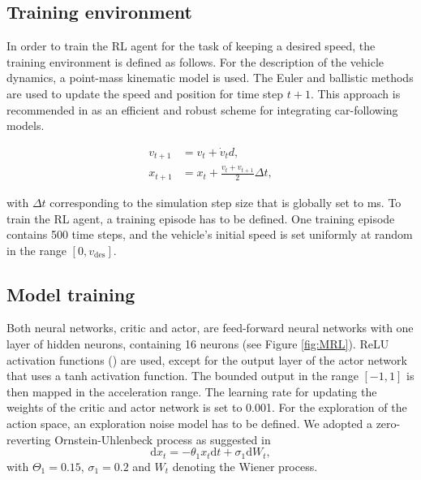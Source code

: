 \documentclass[review]{elsarticle}
\providecommand{\sub}[1]{_{\mathrm{#1}}}  %
\providecommand{\3}{{\ss}}
\begin{document}
	
	\subsection{Training environment}
	\label{training_environment1}
	In order to train the RL agent for the task of keeping a desired
	speed, the training environment is defined as follows. For the description of the vehicle dynamics, a point-mass kinematic model is used. The Euler and ballistic methods are used to update the speed and position for time step $t + 1$. This approach is recommended in \cite{numericalUpdateMethodsTreiber} as an efficient
	and robust scheme for integrating car-following models.
	
	\begin{align}
	v_{t+1} &= v_{t} + \dot{v}_{t} d, \\
	x_{t+1} &= x_{t} + \frac{v_{t} + v_{t+1}}{2} \Delta t,
	\end{align}
	
	
	with $\Delta t$ corresponding to the simulation step size that is globally
	set to \unit[100]{ms}. To train the RL agent, a training episode has to be defined. One training episode contains 500 time steps, and the vehicle's initial speed is set uniformly at random in the range $[0,v\sub{des}]$.
	
	\subsection{Model training}
	Both neural networks, critic and actor, are feed-forward neural
	networks with one layer of hidden neurons, containing 16 neurons (see
	Figure \ref{fig:MRL}). ReLU activation functions (\cite{relu}) are used, except for the output layer of the actor network that uses a tanh activation function. The bounded output in the range $[-1,1]$ is then mapped in the acceleration range. The learning rate for updating the weights of the critic and actor network is set to 0.001. For the exploration of the action space, an exploration noise model has to be defined. We adopted a
	zero-reverting Ornstein-Uhlenbeck process as suggested in \cite{DDPG}
	\begin{equation}
    \mathrm{d} x_{t}=-\theta_1 x_{t} \mathrm{d} t+\sigma_1 \mathrm{d} W_{t},
	\end{equation}
    with $\Theta_1 = 0.15$, $\sigma_1 = 0.2$ and $W_{t}$ denoting the Wiener process.
	
\end{document}
